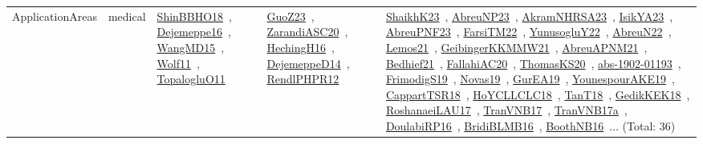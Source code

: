 {\begin{longtable}{lp{3cm}>{\raggedright\arraybackslash}p{6cm}>{\raggedright\arraybackslash}p{6cm}>{\raggedright\arraybackslash}p{8cm}}
ApplicationAreas & medical & \href{works/ShinBBHO18.pdf}{ShinBBHO18}~\cite{ShinBBHO18}, \href{works/Dejemeppe16.pdf}{Dejemeppe16}~\cite{Dejemeppe16}, \href{works/WangMD15.pdf}{WangMD15}~\cite{WangMD15}, \href{works/Wolf11.pdf}{Wolf11}~\cite{Wolf11}, \href{works/TopalogluO11.pdf}{TopalogluO11}~\cite{TopalogluO11} & \href{works/GuoZ23.pdf}{GuoZ23}~\cite{GuoZ23}, \href{works/ZarandiASC20.pdf}{ZarandiASC20}~\cite{ZarandiASC20}, \href{works/HechingH16.pdf}{HechingH16}~\cite{HechingH16}, \href{works/DejemeppeD14.pdf}{DejemeppeD14}~\cite{DejemeppeD14}, \href{works/RendlPHPR12.pdf}{RendlPHPR12}~\cite{RendlPHPR12} & \href{works/ShaikhK23.pdf}{ShaikhK23}~\cite{ShaikhK23}, \href{works/AbreuNP23.pdf}{AbreuNP23}~\cite{AbreuNP23}, \href{works/AkramNHRSA23.pdf}{AkramNHRSA23}~\cite{AkramNHRSA23}, \href{works/IsikYA23.pdf}{IsikYA23}~\cite{IsikYA23}, \href{works/AbreuPNF23.pdf}{AbreuPNF23}~\cite{AbreuPNF23}, \href{works/FarsiTM22.pdf}{FarsiTM22}~\cite{FarsiTM22}, \href{works/YunusogluY22.pdf}{YunusogluY22}~\cite{YunusogluY22}, \href{works/AbreuN22.pdf}{AbreuN22}~\cite{AbreuN22}, \href{works/Lemos21.pdf}{Lemos21}~\cite{Lemos21}, \href{works/GeibingerKKMMW21.pdf}{GeibingerKKMMW21}~\cite{GeibingerKKMMW21}, \href{works/AbreuAPNM21.pdf}{AbreuAPNM21}~\cite{AbreuAPNM21}, \href{works/Bedhief21.pdf}{Bedhief21}~\cite{Bedhief21}, \href{works/FallahiAC20.pdf}{FallahiAC20}~\cite{FallahiAC20}, \href{works/ThomasKS20.pdf}{ThomasKS20}~\cite{ThomasKS20}, \href{works/abs-1902-01193.pdf}{abs-1902-01193}~\cite{abs-1902-01193}, \href{works/FrimodigS19.pdf}{FrimodigS19}~\cite{FrimodigS19}, \href{works/Novas19.pdf}{Novas19}~\cite{Novas19}, \href{works/GurEA19.pdf}{GurEA19}~\cite{GurEA19}, \href{works/YounespourAKE19.pdf}{YounespourAKE19}~\cite{YounespourAKE19}, \href{works/CappartTSR18.pdf}{CappartTSR18}~\cite{CappartTSR18}, \href{works/HoYCLLCLC18.pdf}{HoYCLLCLC18}~\cite{HoYCLLCLC18}, \href{works/TanT18.pdf}{TanT18}~\cite{TanT18}, \href{works/GedikKEK18.pdf}{GedikKEK18}~\cite{GedikKEK18}, \href{works/RoshanaeiLAU17.pdf}{RoshanaeiLAU17}~\cite{RoshanaeiLAU17}, \href{works/TranVNB17.pdf}{TranVNB17}~\cite{TranVNB17}, \href{works/TranVNB17a.pdf}{TranVNB17a}~\cite{TranVNB17a}, \href{works/DoulabiRP16.pdf}{DoulabiRP16}~\cite{DoulabiRP16}, \href{works/BridiBLMB16.pdf}{BridiBLMB16}~\cite{BridiBLMB16}, \href{works/BoothNB16.pdf}{BoothNB16}~\cite{BoothNB16}... (Total: 36)\\

\end{longtable}}
